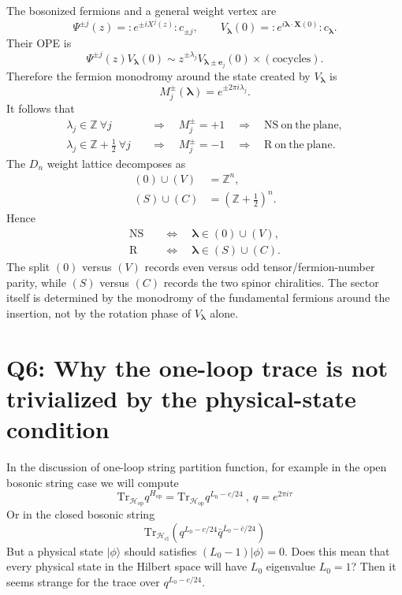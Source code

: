 \documentclass[
  10pt,
  a4paper,
  openany]{book}
\begin{document}
The bosonized fermions and a general weight vertex are \[
\Psi^{\pm j}(z)
=:\!e^{\pm iX^j(z)}\!:c_{\pm j},
\qquad
V_{\boldsymbol\lambda}(0)
=:\!e^{i\boldsymbol\lambda\cdot\mathbf X(0)}\!:
c_{\boldsymbol\lambda}.
\] Their OPE is \[
\boxed{
\Psi^{\pm j}(z)V_{\boldsymbol\lambda}(0)
\sim
z^{\pm\lambda_j}
V_{\boldsymbol\lambda\pm\mathbf e_j}(0)
\times(\text{cocycles}).
}
\] Therefore the fermion monodromy around the state created by
\(V_{\boldsymbol\lambda}\) is \[
\boxed{
M_j^\pm(\boldsymbol\lambda)
=e^{\pm2\pi i\lambda_j}.
}
\] It follows that \[
\begin{aligned}
\lambda_j\in\mathbb Z\ \forall j
&\quad\Longrightarrow\quad
M_j^\pm=+1
\quad\Longrightarrow\quad
\mathrm{NS\ on\ the\ plane},\\%
\lambda_j\in\mathbb Z+\frac12\ \forall j
&\quad\Longrightarrow\quad
M_j^\pm=-1
\quad\Longrightarrow\quad
\mathrm{R\ on\ the\ plane}.
\end{aligned}
\] The \(D_n\) weight lattice decomposes as \[
\begin{aligned}
(0)\cup(V)
&=\mathbb Z^n,\\%
(S)\cup(C)
&=\left(\mathbb Z+\frac12\right)^n.
\end{aligned}
\] Hence \[
\boxed{
\begin{aligned}
\mathrm{NS}
&\quad\Longleftrightarrow\quad
\boldsymbol\lambda\in(0)\cup(V),\\%
\mathrm R
&\quad\Longleftrightarrow\quad
\boldsymbol\lambda\in(S)\cup(C).
\end{aligned}
}
\] The split \((0)\) versus \((V)\) records even versus odd
tensor/fermion-number parity, while \((S)\) versus \((C)\) records the
two spinor chiralities. The sector itself is determined by the monodromy
of the fundamental fermions around the insertion, not by the rotation
phase of \(V_{\boldsymbol\lambda}\) alone.

\section{Q6: Why the one-loop trace is not trivialized by the
physical-state
condition}\label{q6-why-the-one-loop-trace-is-not-trivialized-by-the-physical-state-condition}

In the discussion of one-loop string partition function, for example in
the open bosonic string case we will compute \[
\mathrm{Tr}_{\mathcal{H}_{\mathrm{op}}}q^{H_{\mathrm{op}}}=\mathrm{Tr}_{\mathcal{H}_{\mathrm{op}}}q^{L_{0}-c/24} \ , \ q=e^{2\pi i\tau}
\] Or in the closed bosonic string \[
\mathrm{Tr}_{\mathcal{H}_{\mathrm{cl}}}(q^{L_{0}-c/24}\bar{q}^{\bar{L}_{0}-\bar{c}/24})
\] But a physical state \(|\phi \rangle\) should satisfies
\((L_{0}-1)|\phi \rangle=0\). Does this mean that every physical state
in the Hilbert space will have \(L_{0}\) eigenvalue \(L_{0}=1\)? Then it
seems strange for the trace over \(q^{L_{0}-c/24}\).
\end{document}
